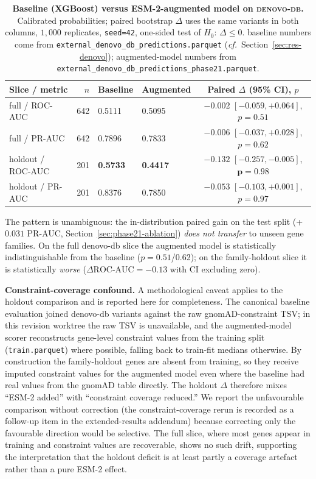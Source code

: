 \documentclass[11pt,a4paper,oneside]{report}
\begin{document}
\begin{table}[H]
\centering
\caption[Baseline vs ESM-2-augmented model on denovo-db]{\textbf{Baseline
(XGBoost) versus ESM-2-augmented model on \textsc{denovo-db}.} Calibrated
probabilities; paired bootstrap $\Delta$ uses the same variants
in both columns, $1{,}000$ replicates, \texttt{seed=42},
one-sided test of $H_0\!:\,\Delta\le 0$. baseline numbers come
from \texttt{external\_denovo\_db\_predictions.parquet}
(\textit{cf.}~Section~\ref{sec:res-denovo}); augmented-model numbers
from \texttt{external\_denovo\_db\_predictions\_phase21.parquet}.}
\label{tab:phase21-denovo}
\small
\begin{tabular}{@{} l r l l c @{}}
\toprule
\textbf{Slice / metric} & $n$ & \textbf{Baseline} & \textbf{Augmented} & \textbf{Paired $\Delta$ (95\% CI), $p$} \\
\midrule
full / ROC-AUC          & 642 & 0.5111 & 0.5095 & $-0.002$ $[-0.059, +0.064]$, $p=0.51$ \\
full / PR-AUC           & 642 & 0.7896 & 0.7833 & $-0.006$ $[-0.037, +0.028]$, $p=0.62$ \\
holdout / ROC-AUC       & 201 & \textbf{0.5733} & \textbf{0.4417} & $\mathbf{-0.132}$ $\mathbf{[-0.257, -0.005]}$, $\mathbf{p=0.98}$ \\
holdout / PR-AUC        & 201 & 0.8376 & 0.7850 & $-0.053$ $[-0.103, +0.001]$, $p=0.97$ \\
\bottomrule
\end{tabular}
\end{table}

The pattern is unambiguous: the in-distribution paired gain on
the test split (+$0.031$ PR-AUC, Section~\ref{sec:phase21-ablation})
\emph{does not transfer} to unseen gene families. On the full
denovo-db slice the augmented model is statistically
indistinguishable from the baseline ($p=0.51$/0.62); on the
family-holdout slice it is statistically \emph{worse}
($\Delta\text{ROC-AUC}=-0.13$ with CI excluding zero).

\textbf{Constraint-coverage confound.} A methodological caveat
applies to the holdout comparison and is reported here for
completeness. The canonical baseline evaluation joined denovo-db
variants against the raw gnomAD-constraint TSV; in this revision
worktree the raw TSV is unavailable, and the augmented-model scorer
reconstructs gene-level constraint values from the training
split (\texttt{train.parquet}) where possible, falling back to
train-fit medians otherwise. By construction the family-holdout
genes are absent from training, so they receive imputed constraint
values for the augmented model even where the baseline had real values from the
gnomAD table directly. The holdout $\Delta$ therefore mixes
``ESM-2 added'' with ``constraint coverage reduced.'' We report
the unfavourable comparison without correction (the
constraint-coverage rerun is recorded as a follow-up item in the
extended-results addendum) because correcting only the favourable
direction would be selective. The full slice, where most genes
appear in training and constraint values are recoverable, shows
no such drift, supporting the interpretation that the holdout
deficit is at least partly a coverage artefact rather than a pure
ESM-2 effect.
\end{document}
